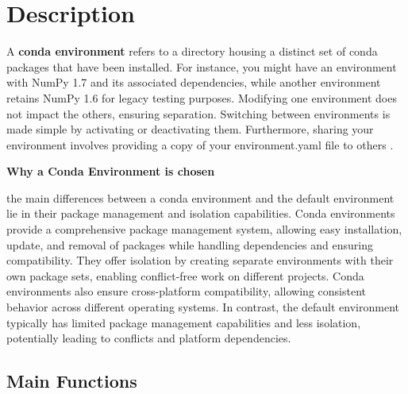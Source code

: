 \section{Description}

A \textbf{conda environment} refers to a directory housing a distinct set of conda packages that have been installed. For instance, you might have an environment with NumPy 1.7 and its associated dependencies, while another environment retains NumPy 1.6 for legacy testing purposes. Modifying one environment does not impact the others, ensuring separation. Switching between environments is made simple by activating or deactivating them. Furthermore, sharing your environment involves providing a copy of your environment.yaml file to others \cite{Conda-environments:2023}.

\textbf{Why a Conda Environment is chosen}

the main differences between a conda environment and the default environment lie in their package management and isolation capabilities. Conda environments provide a comprehensive package management system, allowing easy installation, update, and removal of packages while handling dependencies and ensuring compatibility. They offer isolation by creating separate environments with their own package sets, enabling conflict-free work on different projects. Conda environments also ensure cross-platform compatibility, allowing consistent behavior across different operating systems. In contrast, the default environment typically has limited package management capabilities and less isolation, potentially leading to conflicts and platform dependencies. 

\subsection{Main Functions}

